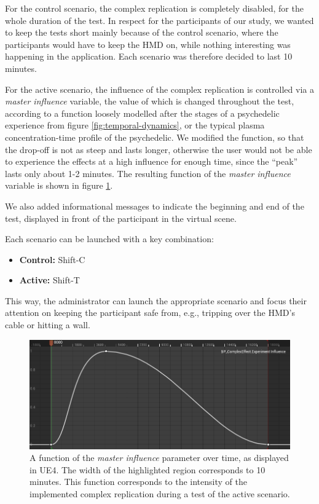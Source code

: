 For the control scenario, the complex replication is completely disabled, for the whole duration of the test. In respect for the participants of our study, we wanted to keep the tests short mainly because of the control scenario, where the participants would have to keep the \ac{HMD} on, while nothing interesting was happening in the application. Each scenario was therefore decided to last 10 minutes.

For the active scenario, the influence of the complex replication is controlled via a \textit{master influence} variable, the value of which is changed throughout the test, according to a function loosely modelled after the stages of a psychedelic experience from figure \ref{fig:temporal-dynamics}, or the typical plasma concentration-time profile of the psychedelic. We modified the function, so that the drop-off is not as steep and lasts longer, otherwise the user would not be able to experience the effects at a high influence for enough time, since the ``peak'' lasts only about 1-2 minutes. The resulting function of the \textit{master influence} variable is shown in figure \ref{fig:master-influence}.

We also added informational messages to indicate the beginning and end of the test, displayed in front of the participant in the virtual scene.

Each scenario can be launched with a key combination:

\begin{itemize}
    \item \textbf{Control:} Shift-C
    \item \textbf{Active:} Shift-T
\end{itemize}

This way, the administrator can launch the appropriate scenario and focus their attention on keeping the participant safe from, e.g., tripping over the \ac{HMD}'s cable or hitting a wall.

\begin{figure}[H]
    \centering
    \ifgraphics
        \includegraphics[width=\textwidth]{img/simr-master-influence.png}
    \fi
    \caption{A function of the \textit{master influence} parameter over time, as displayed in \ac{UE4}. The width of the highlighted region corresponds to 10 minutes. This function corresponds to the intensity of the implemented complex replication during a test of the active scenario.}\label{fig:master-influence}
\end{figure}
